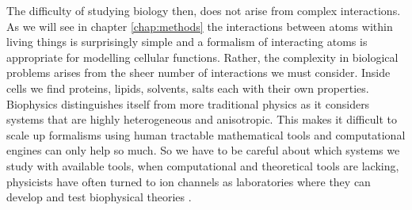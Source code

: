 The difficulty of studying biology then, does not arise from complex interactions. As we will see in chapter \ref{chap:methods} the interactions between atoms within living things is surprisingly simple and a formalism of interacting atoms is appropriate for modelling cellular functions. Rather, the complexity in biological problems arises from the sheer number of interactions we must consider. Inside cells we find proteins, lipids, solvents, salts each with their own properties. Biophysics distinguishes itself from more traditional physics as it considers systems that are highly heterogeneous and anisotropic. This makes it difficult to scale up formalisms using human tractable mathematical tools and computational engines can only help so much. So we have to be careful about which systems we study with available tools, when computational and theoretical tools are lacking, physicists have often turned to ion channels as laboratories where they can develop and test biophysical theories \cite{moy2000, corry2000}.






